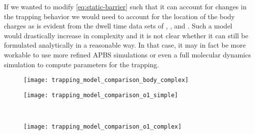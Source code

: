 If we wanted to modify \cref{eq:static-barrier} such that it can account for changes in the trapping behavior
we would need to account for the location of the body charges as is evident from the dwell time data sets of
, , and . Such a model would drastically increase in complexity and it is
not clear whether it can still be formulated analytically in a reasonable way. In that case, it may in fact be
more workable to use more refined APBS simulations or even a full molecular dynamics simulation to compute
parameters for the trapping.

%
\begin{figure*}[p]
  \centering
  \begin{subfigure}[t]{5.5cm}
		\centering
		\caption{}\vspace{-3mm}\label{fig:trapping_model_comparison_body_complex}
    \texttt{[image: trapping\_model\_comparison\_body\_complex]}
  \end{subfigure}
  \begin{minipage}[t]{6cm}
    \begin{subfigure}[t]{5.5cm}
      \centering
      \caption{}\vspace{-3mm}\label{fig:trapping_model_comparison_o1_simple}
      \texttt{[image: trapping\_model\_comparison\_o1\_simple]}
    \end{subfigure}
    \\
    \begin{subfigure}[t]{5.5cm}
      \centering
      \caption{}\vspace{-3mm}\label{fig:trapping_model_comparison_o1_complex}
      \texttt{[image: trapping\_model\_comparison\_o1\_complex]}
    \end{subfigure}
  \end{minipage}


\end{figure*}
